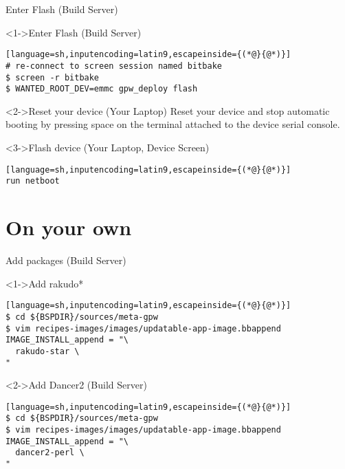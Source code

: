\documentclass[ngerman,xcolor={table,dvipsnames},smaller,compress,hyperref={bookmarks,colorlinks},handout]{beamer}%
\begin{document}
\begin{frame}[fragile]{Enter Flash (Build Server)}
\begin{block}<1->{Enter Flash (Build Server)}
\begin{lstlisting}[language=sh,inputencoding=latin9,escapeinside={(*@}{@*)}]
# re-connect to screen session named bitbake
$ screen -r bitbake
$ WANTED_ROOT_DEV=emmc gpw_deploy flash
\end{lstlisting}
\end{block}

\begin{block}<2->{Reset your device (Your Laptop)}
Reset your device and stop automatic booting by pressing space on the terminal
attached to the device serial console.
\end{block}

\begin{block}<3->{Flash device (Your Laptop, Device Screen)}
\begin{lstlisting}[language=sh,inputencoding=latin9,escapeinside={(*@}{@*)}]
run netboot
\end{lstlisting}
\end{block}
\end{frame}

\part{On your own}

\begin{frame}[fragile]{Add packages (Build Server)}
\begin{block}<1->{Add rakudo*}
\small
\begin{lstlisting}[language=sh,inputencoding=latin9,escapeinside={(*@}{@*)}]
$ cd ${BSPDIR}/sources/meta-gpw
$ vim recipes-images/images/updatable-app-image.bbappend
IMAGE_INSTALL_append = "\
  rakudo-star \
"
\end{lstlisting}
\end{block}

\begin{block}<2->{Add Dancer2 (Build Server)}
\small
\begin{lstlisting}[language=sh,inputencoding=latin9,escapeinside={(*@}{@*)}]
$ cd ${BSPDIR}/sources/meta-gpw
$ vim recipes-images/images/updatable-app-image.bbappend
IMAGE_INSTALL_append = "\
  dancer2-perl \
"
\end{lstlisting}
\end{block}
\end{frame}
\end{document}
